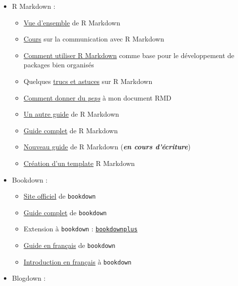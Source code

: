 \documentclass[
  french,
]{book}
\providecommand{\tightlist}{%
  \setlength{\itemsep}{0pt}\setlength{\parskip}{0pt}}
\begin{document}
\begin{itemize}
\tightlist
\item
  R Markdown :

  \begin{itemize}
  \tightlist
  \item
    \href{https://rmarkdown.rstudio.com/lesson-1.html}{Vue d'ensemble} de R Markdown
  \item
    \href{https://ysc-rmarkdown.netlify.app/}{Cours} sur la communication avec R Markdown
  \item
    \href{https://emilyriederer.netlify.app/post/rmarkdown-driven-development/}{Comment utiliser R Markdown}
    comme base pour le développement de packages bien organisés
  \item
    Quelques \href{https://www.dataquest.io/blog/r-markdown-tips-tricks-and-shortcuts/}{trucs et astuces}
    sur R Markdown
  \item
    \href{https://holtzy.github.io/Pimp-my-rmd/}{Comment donner du \emph{peps}}
    à mon document RMD
  \item
    \href{https://www.dataquest.io/blog/r-markdown-guide-cheatsheet/}{Un autre guide}
    de R Markdown
  \item
    \href{https://bookdown.org/yihui/rmarkdown/}{Guide complet} de R Markdown
  \item
    \href{https://bookdown.org/yihui/rmarkdown-cookbook/}{Nouveau guide}
    de R Markdown (\textbf{\emph{en cours d'écriture}})
  \item
    \href{https://danawanzer.com/using-r-for-immediate-reporting-in-evaluation/}{Création d'un template}
    R Markdown
  \end{itemize}
\item
  Bookdown :

  \begin{itemize}
  \tightlist
  \item
    \href{https://bookdown.org/home/about/}{Site officiel} de \texttt{bookdown}
  \item
    \href{https://bookdown.org/yihui/bookdown/}{Guide complet} de \texttt{bookdown}
  \item
    Extension à \texttt{bookdown} : \href{https://bookdown.org/baydap/bookdownplus/}{\texttt{bookdownplus}}
  \item
    \href{https://statistique-et-logiciel-r.com/creer-un-livre-document-avec-bookdown/}{Guide en français}
    de \texttt{bookdown}
  \item
    \href{https://thinkr.fr/rediger-avec-bookdown-pourquoi-comment/}{Introduction en français}
    à \texttt{bookdown}
  \end{itemize}
\item
  Blogdown :


\end{itemize}
\end{document}
